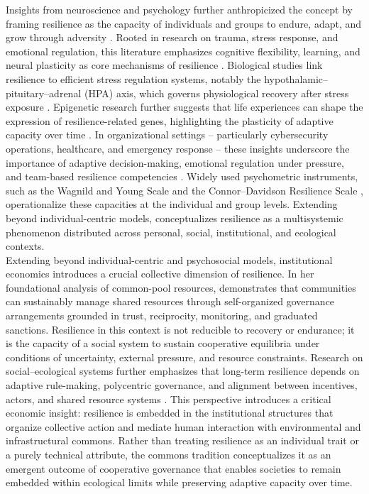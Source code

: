 Insights from neuroscience and psychology further anthropicized the concept by framing resilience as the capacity of individuals and groups to endure, adapt, and grow through adversity \autocite{luthar2000construct, kalisch2024neurobiology}. Rooted in research on trauma, stress response, and emotional regulation, this literature emphasizes cognitive flexibility, learning, and neural plasticity as core mechanisms of resilience \autocite{feder2019biology, masten2010disasters}. Biological studies link resilience to efficient stress regulation systems, notably the hypothalamic–pituitary–adrenal (HPA) axis, which governs physiological recovery after stress exposure \autocite{mcewen2004protection}. Epigenetic research further suggests that life experiences can shape the expression of resilience-related genes, highlighting the plasticity of adaptive capacity over time \autocite{rakesh2019resilience}. In organizational settings -- particularly cybersecurity operations, healthcare, and emergency response -- these insights underscore the importance of adaptive decision-making, emotional regulation under pressure, and team-based resilience competencies \autocite{norris2008community, kruk2017building, haldane2021health}. Widely used psychometric instruments, such as the Wagnild and Young Scale \autocite{wagnild1993development} and the Connor–Davidson Resilience Scale \autocite{campbell2007psychometric}, operationalize these capacities at the individual and group levels. Extending beyond individual-centric models, \textcite{ungar2021modeling} conceptualizes resilience as a multisystemic phenomenon distributed across personal, social, institutional, and ecological contexts.\\

Extending beyond individual-centric and psychosocial models, 
institutional economics introduces a crucial collective dimension of resilience. In her foundational analysis of common-pool resources, \textcite{ostrom1990governing} demonstrates that communities can sustainably manage shared resources through self-organized governance arrangements grounded in trust, reciprocity, monitoring, and graduated sanctions. Resilience in this context is not reducible to recovery or endurance; it is the capacity of a social system to sustain cooperative equilibria under conditions of uncertainty, external pressure, and resource constraints. Research on social–ecological systems further emphasizes that long-term resilience depends on adaptive rule-making, polycentric governance, and alignment between incentives, actors, and shared resource systems \autocite{ostrom1990governing, lebel2006governance}. This perspective introduces a critical economic insight: resilience is embedded in the institutional structures that organize collective action and mediate human interaction with environmental and infrastructural commons. Rather than treating resilience as an individual trait or a purely technical attribute, the commons tradition conceptualizes it as an emergent outcome of cooperative governance that enables societies to remain embedded within ecological limits while preserving adaptive capacity over time.\\

